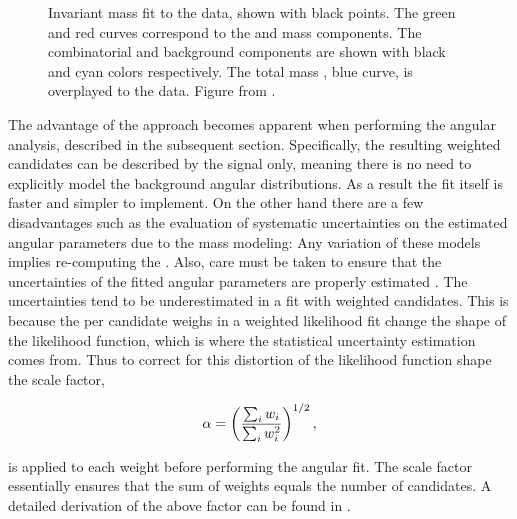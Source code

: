 \begin{figure}[t]
  \centering
  \scalebox{0.5}{}
  \caption{Invariant mass fit to the data, shown with black points. The green and red curves correspond to the \BdJpsiKst and
           \BsJpsiKst mass \pdf components. The combinatorial and \LbJpsipK background components are shown with black and cyan
           colors respectively. The total mass \pdf, blue curve, is overplayed to the data. Figure from \cite{bsjpsikst-paper}. }
  \label{mass_plot}
\end{figure}

The advantage of the \sWeights approach becomes apparent when performing the angular analysis, described in the subsequent section.
Specifically, the resulting weighted candidates can be described by the signal \pdf only, meaning there is no need to explicitly model
the background angular distributions. As a result the fit itself is faster and simpler to implement. On the other hand there are a few
disadvantages such as the evaluation of systematic uncertainties on the estimated angular parameters due to the mass \pdf modeling:
Any variation of these models implies re-computing the \sWeights. Also, care must be taken to ensure that the uncertainties
of the fitted angular parameters are properly estimated \cite{splot}. The uncertainties tend to be underestimated in a fit
with weighted candidates. This is because the per candidate weighs in a weighted likelihood fit change the shape of the 
likelihood function, which is where the statistical uncertainty estimation comes from. 
Thus to correct for this distortion of the likelihood function shape the scale factor,

\begin{equation}
  \centering
  \alpha = \left(\frac{\sum_{i} w_i}{\sum_{i} w_i^2}\right)^{1/2},
  \label{sWeights_scale_factor}
\end{equation}

\noindent is applied to each weight before performing the angular fit. The scale factor essentially ensures that the sum of weights
equals the number of candidates. A detailed derivation of the above factor can be found in \cite{jeroenThesis}.
